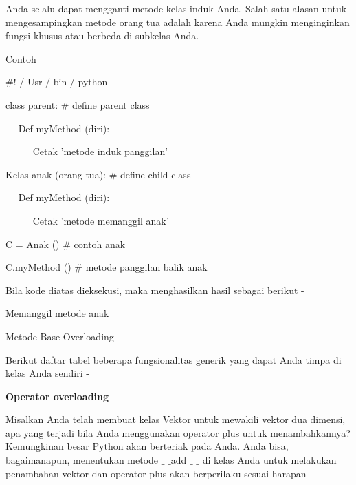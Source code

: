\begin{12pt}
\begin{12pt}
\begin{12pt}
\begin{12pt}
\begin{12pt}
\begin{12pt}
\begin{12pt}
\begin{12pt}
\begin{12pt}
\begin{12pt}
\begin{12pt}
\begin{12pt}
\begin{12pt}
\begin{12pt}
\begin{12pt}
\begin{12pt}
Anda selalu dapat mengganti metode kelas induk Anda. Salah satu alasan untuk mengesampingkan metode orang tua adalah karena Anda mungkin menginginkan fungsi khusus atau berbeda di subkelas Anda. \par
Contoh \par
\vspace{12pt}
\noindent 
 $  \#  $! / Usr / bin / python \par
\vspace{12pt}
\noindent 
class parent:  $  \#  $ define parent class \par
\noindent 
~~ Def myMethod (diri): \par
\noindent 
~~~~~ Cetak 'metode induk panggilan' \par
\vspace{12pt}
\noindent 
Kelas anak (orang tua):  $  \#  $ define child class \par
\noindent 
~~ Def myMethod (diri): \par
\noindent 
~~~~~ Cetak 'metode memanggil anak' \par
\vspace{12pt}
\noindent 
C = Anak ()  $  \#  $ contoh anak \par
\noindent 
C.myMethod ()  $  \#  $ metode panggilan balik anak \par
\vspace{12pt}
\noindent 
Bila kode diatas dieksekusi, maka menghasilkan hasil sebagai berikut - \par
\vspace{12pt}
\noindent 
Memanggil metode anak \par
\vspace{12pt}
\noindent 
Metode Base Overloading \par
\vspace{12pt}
\noindent 
Berikut daftar tabel beberapa fungsionalitas generik yang dapat Anda timpa di kelas Anda sendiri - \par
\vspace{14pt}
\noindent 
{\fontsize{14pt}{14pt}\selectfont \textbf{Operator overloading} \\} \par
\vspace{12pt}
Misalkan Anda telah membuat kelas Vektor untuk mewakili vektor dua dimensi, apa yang terjadi bila Anda menggunakan operator plus untuk menambahkannya? Kemungkinan besar Python akan berteriak pada Anda. Anda bisa, bagaimanapun, menentukan metode  $  \_  $ $  \_  $add $  \_  $ $  \_  $ di kelas Anda untuk melakukan penambahan vektor dan operator plus akan berperilaku sesuai harapan - \par

\end{12pt}
\end{12pt}
\end{12pt}
\end{12pt}
\end{12pt}
\end{12pt}
\end{12pt}
\end{12pt}
\end{12pt}
\end{12pt}
\end{12pt}
\end{12pt}
\end{12pt}
\end{12pt}
\end{12pt}
\end{12pt}
